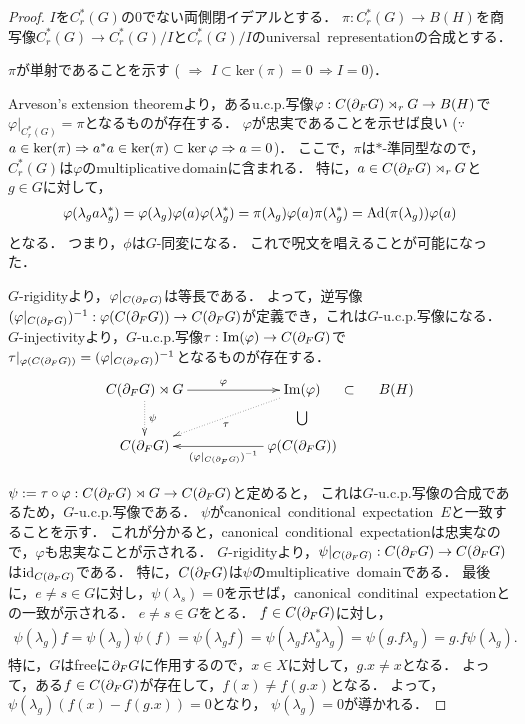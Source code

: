 \documentclass{jsarticle}[12pt]
\begin{document}
\begin{proof}
  $I$を$C_r^*(G)$の$0$でない両側閉イデアルとする．
  $\pi: C_r^*(G) \rightarrow B(H)$を商写像$C_r^*(G) \rightarrow C_r^*(G)/I$と$C_r^*(G)/I$のuniversal\, representationの合成とする．

  $\pi$が単射であることを示す
  ( $\Rightarrow$ $I \subset ${\rm ker}$(\pi) = 0 \, \Rightarrow I = 0$)．
  
  Arveson's extension theoremより，あるu.c.p.写像$\varphi : C(\frak{\partial}_FG) \rtimes_r G \rightarrow B(H)$で$\varphi|_{C_r^*(G)} = \pi$となるものが存在する．
  $\varphi$が忠実であることを示せば良い
  ($\because$ $a \in {\rm ker}(\pi) \Rightarrow a^*a \in {\rm ker}(\pi) \subset {\ker \varphi} \Rightarrow a = 0$)．
  ここで，$\pi$は$\ast$-準同型なので，$C_r^*(G)$は$\varphi$のmultiplicative\,domainに含まれる．
  特に，$a \in  C(\frak{\partial}_FG) \rtimes_r G$と$g \in G$に対して，
  \begin{align*}
    \varphi(\lambda_g a \lambda_g^*) = \varphi(\lambda_g) \varphi(a) \varphi(\lambda_g^*) =  \pi(\lambda_g) \varphi(a) \pi(\lambda_g^*) = {\rm Ad}(\pi(\lambda_g))\varphi(a)
  \end{align*}
  となる．
  つまり，$\phi$は$G$-同変になる．
  これで呪文を唱えることが可能になった．

  $G$-rigidityより，$\varphi|_{C(\frak{\partial}_F G)}$は等長である．
  よって，逆写像$(\varphi|_{C(\frak{\partial}_F G)})^{-1} : \varphi(C(\frak{\partial}_F G)) \rightarrow C(\frak{\partial}_FG)$が定義でき，これは$G$-u.c.p.写像になる．
  $G$-injectivityより，$G$-u.c.p.写像$\tau : {\rm Im}(\varphi) \rightarrow C(\frak{\partial}_F G)$で$\tau|_{\varphi(C(\frak{\partial}_F G))} = (\varphi|_{C(\frak{\partial}_F G)})^{-1}$となるものが存在する．
  \[
  \xymatrix{
    C(\d_F G)\rtimes G \ar[rr]^{\varphi} \ar@{.>}[d]^{\psi}& & {\rm Im}(\varphi)\ar@{}[d]|{\bigcup} \ar@{.>}[dll]^{\tau} \ar@{}[r]|*{\subset}&B(H) \\
    C(\d_F G) & & \varphi(C(\d_F G))  \ar[ll]^{(\varphi|_{C(\d_F G)})^{-1}}&
  }
  \]

  $\psi := \tau \circ \varphi :  C(\frak{\partial}_F G)\rtimes G \rightarrow C(\frak{\partial}_F G)$と定めると，
  これは$G$-u.c.p.写像の合成であるため，$G$-u.c.p.写像である．
  $\psi$がcanonical\, conditional\, expectation\, $E$と一致することを示す．
  これが分かると，canonical\, conditional\, expectationは忠実なので，$\varphi$も忠実なことが示される．
  $G$-rigidityより，$\psi|_{C(\frak{\partial}_F G)} : C(\frak{\partial}_F G) \rightarrow C(\frak{\partial}_F G)$は${\rm id}_{C(\frak{\partial}_F G)}$である．
  特に，$C(\frak{\partial}_F G)$は$\psi$のmultiplicative\, domainである．
  最後に，$e \neq s \in G$に対し，$\psi(\lambda_s) = 0$を示せば，canonical\, conditinal\, expectationとの一致が示される．
  $e \neq s \in G$をとる．
  $f \in C(\frak{\partial}_F G)$に対し，
  \begin{align*}
    \psi(\lambda_g)f = \psi(\lambda_g) \psi(f) = \psi(\lambda_gf) = \psi(\lambda_g f \lambda_g^* \lambda_g)
    = \psi(g.f \lambda_g) = g.f\psi(\lambda_g).
  \end{align*}
  特に，$G$はfreeに$\frak{\partial}_FG$に作用するので，$x \in X$に対して，$g.x \neq x$となる．
  よって，ある$f \in C(\frak{\partial}_F G)$が存在して，$f(x) \neq f(g.x)$となる．
  よって，$\psi(\lambda_g)(f(x) - f(g.x)) = 0$となり，
  $\psi(\lambda_g) = 0$が導かれる．
\end{proof}




\end{document}
